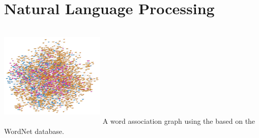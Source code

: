 \chapter{Natural Language Processing}

\includegraphics[width=5.0cm,height=5.0cm]{wordassociation.jpg} 
A word association graph using the based on the WordNet database. 

